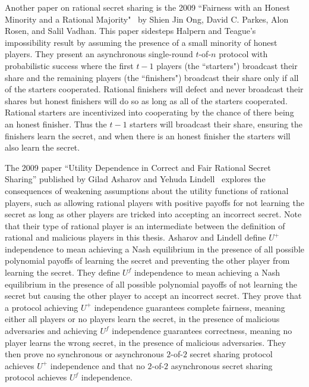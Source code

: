 \documentclass[12pt]{dalcsthesis}
\begin{document}
Another paper on rational secret sharing is the 2009 ``Fairness with an Honest Minority and a Rational Majority"~\cite{ong09} by Shien Jin Ong, David C. Parkes, Alon Rosen, and Salil Vadhan. This paper sidesteps Halpern and Teague's impossibility result by assuming the presence of a small minority of honest players. They present an asynchronous single-round $t$-of-$n$ protocol with probabilistic success where the first $t-1$ players (the ``starters") broadcast their share and the remaining players (the ``finishers") broadcast their share only if all of the starters cooperated. Rational finishers will defect and never broadcast their shares but honest finishers will do so as long as all of the starters cooperated. Rational starters are incentivized into cooperating by the chance of there being an honest finisher. Thus the $t-1$ starters will broadcast their share, ensuring the finishers learn the secret, and when there is an honest finisher the starters will also learn the secret.

The 2009 paper ``Utility Dependence in Correct and Fair Rational Secret Sharing'' published by Gilad Asharov and Yehuda Lindell~\cite{asharov09} explores the consequences of weakening assumptions about the utility functions of rational players, such as allowing rational players with positive payoffs for not learning the secret as long as other players are tricked into accepting an incorrect secret. Note that their type of rational player is an intermediate between the definition of rational and malicious players in this thesis. Asharov and Lindell define $U^{+}$ independence to mean achieving a Nash equilibrium in the presence of all possible polynomial payoffs of learning the secret and preventing the other player from learning the secret. They define $U^f$ independence to mean achieving a Nash equilibrium in the presence of all possible polynomial payoffs of not learning the secret but causing the other player to accept an incorrect secret. They prove that a protocol achieving $U^{+}$ independence guarantees complete fairness, meaning either all players or no players learn the secret, in the presence of malicious adversaries and achieving $U^f$ independence guarantees correctness, meaning no player learns the wrong secret, in the presence of malicious adversaries. They then prove no synchronous or asynchronous $2$-of-$2$ secret sharing protocol achieves $U^{+}$ independence and that no $2$-of-$2$ asynchronous secret sharing protocol achieves $U^f$ independence.
\end{document}
